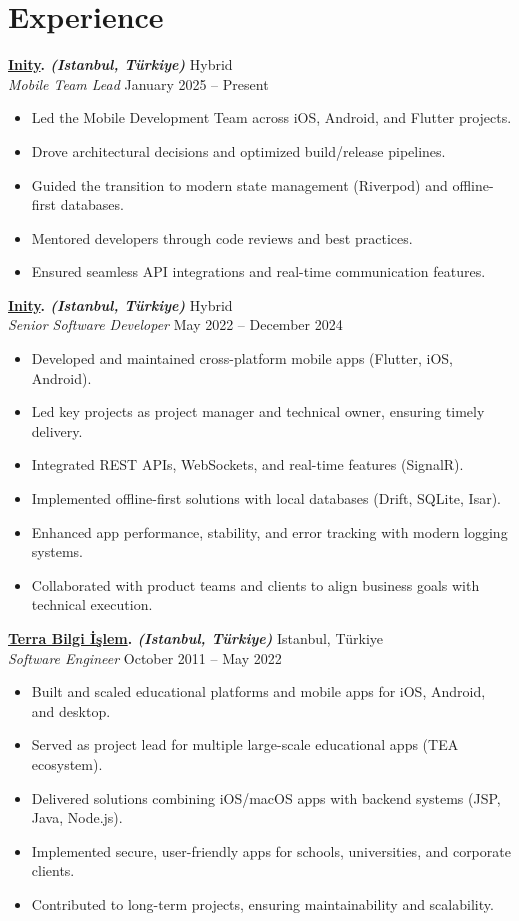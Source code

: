 \documentclass[10pt,a4paper]{extarticle}
\begin{document}
\section{Experience}
\textbf{\href{https://inity.com.tr}{Inity}. \textit{(Istanbul, Türkiye)}} \hfill Hybrid\\
\textit{Mobile Team Lead} \hfill January 2025 -- Present
\begin{itemize}[leftmargin=*,noitemsep,topsep=0pt]
    \item Led the Mobile Development Team across iOS, Android, and Flutter projects.
	\item Drove architectural decisions and optimized build/release pipelines.
	\item Guided the transition to modern state management (Riverpod) and offline-first databases.
	\item Mentored developers through code reviews and best practices.
	\item Ensured seamless API integrations and real-time communication features.
\end{itemize}
\textbf{\href{https://inity.com.tr}{Inity}. \textit{(Istanbul, Türkiye)}} \hfill Hybrid\\
\textit{Senior Software Developer} \hfill May 2022 -- December 2024
\begin{itemize}[leftmargin=*,noitemsep,topsep=0pt]
    \item Developed and maintained cross-platform mobile apps (Flutter, iOS, Android).
	\item Led key projects as project manager and technical owner, ensuring timely delivery.
	\item Integrated REST APIs, WebSockets, and real-time features (SignalR).
	\item Implemented offline-first solutions with local databases (Drift, SQLite, Isar).
	\item Enhanced app performance, stability, and error tracking with modern logging systems.
	\item Collaborated with product teams and clients to align business goals with technical execution.
\end{itemize}
\textbf{\href{https://www.terrabilgiisilem}{Terra Bilgi İşlem}. \textit{(Istanbul, Türkiye)}} \hfill Istanbul, Türkiye\\
\textit{Software Engineer} \hfill October 2011 -- May 2022
\begin{itemize}[leftmargin=*,noitemsep,topsep=0pt]
    \item Built and scaled educational platforms and mobile apps for iOS, Android, and desktop.
	\item Served as project lead for multiple large-scale educational apps (TEA ecosystem).
	\item Delivered solutions combining iOS/macOS apps with backend systems (JSP, Java, Node.js).
	\item Implemented secure, user-friendly apps for schools, universities, and corporate clients.
	\item Contributed to long-term projects, ensuring maintainability and scalability.
\end{itemize}
\end{document}
